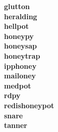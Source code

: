 \textbf{glutton} \cite{glutton2021}\\

\textbf{heralding} \cite{heralding2021}\\

\textbf{hellpot} \cite{hellpot2021}\\

\textbf{honeypy} \cite{honeysap2021}\\

\textbf{honeysap} \cite{honeysap2021}\\

\textbf{honeytrap} \cite{honeytrap2021}\\

\textbf{ipphoney} \cite{ipphoney2021}\\

\textbf{mailoney} \\

\textbf{medpot} \cite{medpot2021}\\

\textbf{rdpy} \cite{rdpy2021}\\

\textbf{redishoneypot} \\

\textbf{snare} \cite{snare2021}\\

\textbf{tanner} \cite{tanner2021}\\



